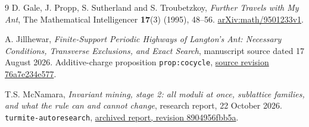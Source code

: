 \documentclass[11pt]{article}
\theoremstyle{definition}
\begin{document}
\begin{thebibliography}{9}
D. Gale, J. Propp, S. Sutherland and S. Troubetzkoy,
\emph{Further Travels with My Ant}, The Mathematical Intelligencer
\textbf{17}(3) (1995), 48--56.
\href{https://arxiv.org/abs/math/9501233v1}{arXiv:math/9501233v1}.

A. Jillhewar, \emph{Finite-Support Periodic Highways of Langton's Ant:
Necessary Conditions, Transverse Exclusions, and Exact Search}, manuscript
source dated 17 August 2026. Additive-charge proposition
\texttt{prop:cocycle},
\href{https://github.com/Atharva12456/langtons-ant-highway/blob/76a7e234e577d992d086c204c3dea00ae72cf10a/paper/main.tex}{source revision 76a7e234e577}.

T.S. McNamara, \emph{Invariant mining, stage 2: all moduli at once, sublattice
families, and what the rule can and cannot change}, research report,
22 October 2026. \texttt{turmite-autoresearch},
\href{https://github.com/timClicks/turmite-autoresearch/blob/8904956fbb5a0e3bce676a39e92f4543f3774c5f/experiments/archive/2026-10-invariant-mining-snf/README.md}{archived report, revision 8904956fbb5a}.
\end{thebibliography}
\end{document}
